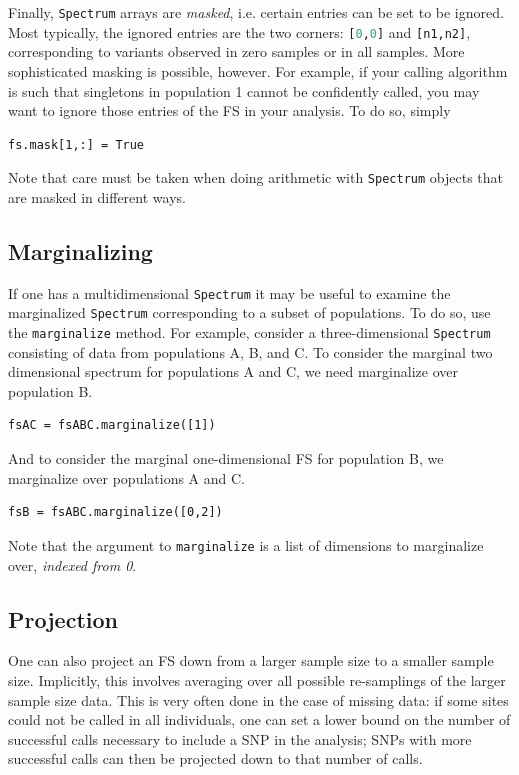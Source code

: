 \documentclass[12pt]{article}
\makeatletter
\newcommand{\py}[1]{\lstinline[language=Python, showstringspaces=False]@#1@}
\makeatother
\begin{document}
Finally, \py{Spectrum} arrays are \emph{masked}, i.e. certain entries can be set to be ignored.
Most typically, the ignored entries are the two corners: \py{[0,0]} and \py{[n1,n2]}, corresponding to variants observed in zero samples or in all samples.
More sophisticated masking is possible, however.
For example, if your calling algorithm is such that singletons in population 1 cannot be confidently called, you may want to ignore those entries of the FS in your analysis.
To do so, simply
\begin{lstlisting}
fs.mask[1,:] = True
\end{lstlisting}
Note that care must be taken when doing arithmetic with \py{Spectrum} objects that are masked in different ways.

\subsection{Marginalizing}

If one has a multidimensional \py{Spectrum} it may be useful to examine the marginalized \py{Spectrum} corresponding to a subset of populations.
To do so, use the \py{marginalize} method.
For example, consider a three-dimensional \py{Spectrum} consisting of data from populations A, B, and C.
To consider the marginal two dimensional spectrum for populations A and C, we need marginalize over population B.
\begin{lstlisting}
fsAC = fsABC.marginalize([1])
\end{lstlisting}
And to consider the marginal one-dimensional FS for population B, we marginalize over populations A and C.
\begin{lstlisting}
fsB = fsABC.marginalize([0,2])
\end{lstlisting}
Note that the argument to \py{marginalize} is a list of dimensions to marginalize over, \emph{indexed from 0}.

\subsection{Projection}

One can also project an FS down from a larger sample size to a smaller sample size.
Implicitly, this involves averaging over all possible re-samplings of the larger sample size data.
This is very often done in the case of missing data: if some sites could not be called in all individuals, one can set a lower bound on the number of successful calls necessary to include a SNP in the analysis; SNPs with more successful calls can then be projected down to that number of calls.
\end{document}
